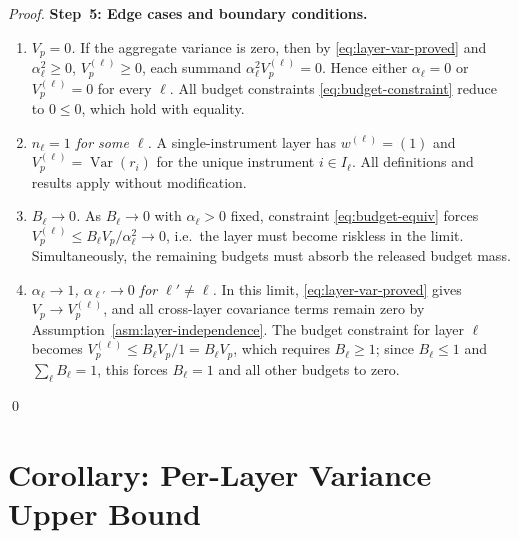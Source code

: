 \documentclass[12pt,openany]{book}
\newcommand{\bfw}{\mathbf{w}}
\DeclareMathOperator{\Var}{Var}
\numberwithin{equation}{chapter}
\theoremstyle{plain}
\theoremstyle{definition}
\theoremstyle{remark}
\def\mathcal#1{#1}%
\def\bfw{w}%
\begin{document}
\begin{proof}
\medskip
\noindent\textbf{Step~5: Edge cases and boundary conditions.}

\begin{enumerate}
  \item \textit{$V_p = 0$.}  If the aggregate variance is zero,
        then by \eqref{eq:layer-var-proved} and
        $\alpha_\ell^2 \geq 0$, $V_p^{(\ell)} \geq 0$, each
        summand $\alpha_\ell^2 V_p^{(\ell)} = 0$.  Hence either
        $\alpha_\ell = 0$ or $V_p^{(\ell)} = 0$ for every
        $\ell$.  All budget constraints \eqref{eq:budget-constraint}
        reduce to $0 \leq 0$, which hold with equality.
  \item \textit{$n_\ell = 1$ for some $\ell$.}  A single-instrument
        layer has $\bfw^{(\ell)} = (1)$ and
        $V_p^{(\ell)} = \Var(r_i)$ for the unique instrument
        $i \in \mathcal{I}_\ell$.  All definitions and results apply
        without modification.
  \item \textit{$B_\ell \to 0$.}  As $B_\ell \to 0$ with
        $\alpha_\ell > 0$ fixed, constraint \eqref{eq:budget-equiv}
        forces $V_p^{(\ell)} \leq B_\ell V_p / \alpha_\ell^2
        \to 0$, i.e.\ the layer must become riskless in the
        limit.  Simultaneously, the remaining budgets must absorb
        the released budget mass.
  \item \textit{$\alpha_\ell \to 1$, $\alpha_{\ell'} \to 0$
        for $\ell' \neq \ell$.}  In this limit,
        \eqref{eq:layer-var-proved} gives
        $V_p \to V_p^{(\ell)}$, and all cross-layer covariance
        terms remain zero by Assumption~\ref{asm:layer-independence}.
        The budget constraint for layer $\ell$ becomes
        $V_p^{(\ell)} \leq B_\ell V_p / 1 = B_\ell V_p$, which
        requires $B_\ell \geq 1$; since $B_\ell \leq 1$ and
        $\sum_\ell B_\ell = 1$, this forces $B_\ell = 1$ and all
        other budgets to zero.
\end{enumerate}

\qed
\end{proof}

\section{Corollary: Per-Layer Variance Upper Bound}
\end{document}
